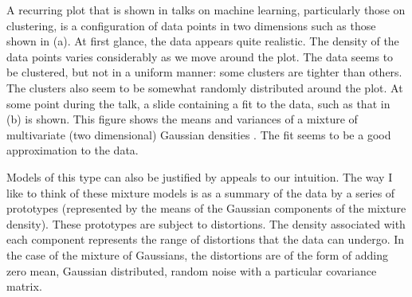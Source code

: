 A recurring plot that is shown in talks on machine learning,
particularly those on clustering, is a configuration of data points in
two dimensions such as those shown in
(a).  At first glance, the
data appears quite realistic. The density of the data points varies
considerably as we move around the plot. The data seems to be
clustered, but not in a uniform manner: some clusters are tighter than
others. The clusters also seem to be somewhat randomly distributed
around the plot. At some point during the talk, a slide containing a
fit to the data, such as that in
(b) is shown. This figure
shows the means and variances of a mixture of multivariate (two
dimensional) Gaussian densities
\citep{McLachlan:mix88}.  The fit seems to be a good approximation to
the data.

Models of this type can also be justified by appeals to our intuition.
The way I like to think of these mixture models is as a summary of the
data by a series of prototypes (represented by the means of the
Gaussian components of the mixture density). These prototypes are
subject to distortions. The density associated with each component
represents the range of distortions that the data can undergo. In the
case of the mixture of Gaussians, the distortions are of the form of
adding zero mean, Gaussian distributed, random
noise with a particular covariance matrix. 

